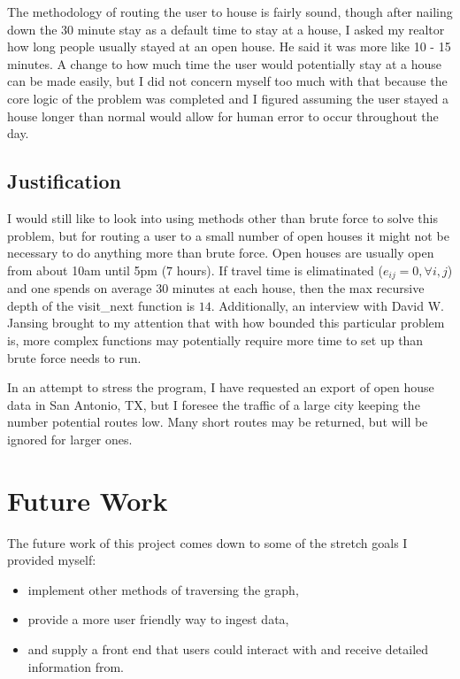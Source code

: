 \documentclass[letterpaper,11pt]{report}
\theoremstyle{definition}
\theoremstyle{definition}
\begin{document}
The methodology of routing the user to house is fairly sound, though after nailing down the 30 minute stay as a default time to stay at a house, I asked my realtor how long people usually stayed at an open house. He said it was more like 10 - 15 minutes. A change to how much time the user would potentially stay at a house can be made easily, but I did not concern myself too much with that because the core logic of the problem was completed and I figured assuming the user stayed a house longer than normal would allow for human error to occur throughout the day.

\subsection{Justification}
I would still like to look into using methods other than brute force to solve this problem, but for routing a user to a small number of open houses it might not be necessary to do anything more than brute force. Open houses are usually open from about 10am until 5pm ($7$ hours). If travel time is elimatinated ($e_{ij} = 0, \forall i,j$) and one spends on average $30$ minutes at each house, then the max recursive depth of the \textsf{visit\_next} function is $14$. Additionally, an interview with David W. Jansing brought to my attention that with how bounded this particular problem is, more complex functions may potentially require more time to set up than brute force needs to run\cite{jansing_jansing_2019}.

In an attempt to stress the program, I have requested an export of open house data in San Antonio, TX, but I foresee the traffic of a large city keeping the number potential routes low. Many short routes may be returned, but will be ignored for larger ones.

\section{Future Work}
\hspace*{-2.5em} The future work of this project comes down to some of the stretch goals I provided myself:
\begin{itemize}
  \item implement other methods of traversing the graph,
  \item provide a more user friendly way to ingest data,
  \item and supply a front end that users could interact with and receive detailed information from.
\end{itemize}
\end{document}
